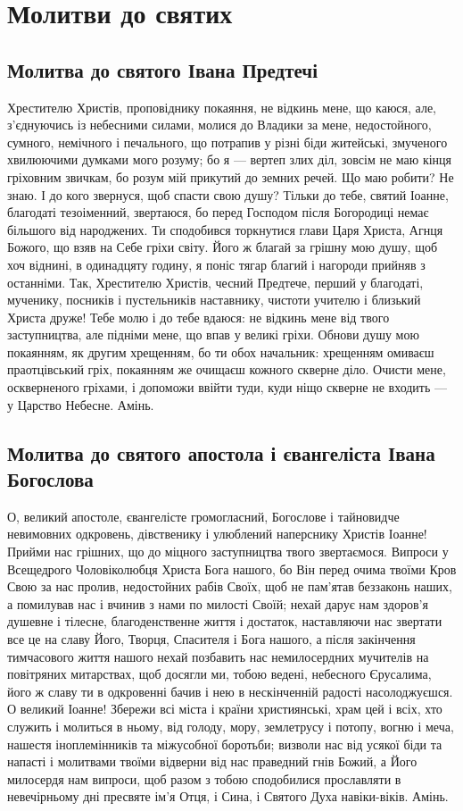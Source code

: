 \documentclass[chapters.tex]{subfiles}
\begin{document}
\chapter{Молитви до святих}
\section{Молитва до святого Івана Предтечі}
Хрестителю Христів, проповіднику покаяння, не відкинь мене, що каюся, але, з’єднуючись із небесними силами, молися до Владики за мене, недостойного, сумного, немічного і печального, що потрапив у різні біди житейські, змученого хвилюючими думками мого розуму; бо я — вертеп злих діл, зовсім не маю кінця гріховним звичкам, бо розум мій прикутий до земних речей. Що маю робити? Не знаю. І до кого звернуся, щоб спасти свою душу? Тільки до тебе, святий Іоанне, благодаті тезоіменний, звертаюся, бо перед Господом після Богородиці немає більшого від народжених. Ти сподобився торкнутися глави Царя Христа, Агнця Божого, що взяв на Себе гріхи світу. Його ж благай за грішну мою душу, щоб хоч віднині, в одинадцяту годину, я поніс тягар благий і нагороди прийняв з останніми. Так, Хрестителю Христів, чесний Предтече, перший у благодаті, мученику, посників і пустельників наставнику, чистоти учителю і близький Христа друже! Тебе молю і до тебе вдаюся: не відкинь мене від твого заступництва, але підніми мене, що впав у великі гріхи. Обнови душу мою покаянням, як другим хрещенням, бо ти обох начальник: хрещенням омиваєш праотцівський гріх, покаянням же очищаєш кожного скверне діло. Очисти мене, оскверненого гріхами, і допоможи ввійти туди, куди ніщо скверне не входить — у Царство Небесне. Амінь.

\section{Молитва до святого апостола і євангеліста Івана Богослова}
О, великий апостоле, євангелісте громогласний, Богослове і тайновидче невимовних одкровень, дівственику і улюблений наперснику Христів Іоанне! Прийми нас грішних, що до міцного заступництва твого звертаємося. Випроси у Всещедрого Чоловіколюбця Христа Бога нашого, бо Він перед очима твоїми Кров Свою за нас пролив, недостойних рабів Своїх, щоб не пам’ятав беззаконь наших, а помилував нас і вчинив з нами по милості Своїй; нехай дарує нам здоров’я душевне і тілесне, благоденственне життя і достаток, наставляючи нас звертати все це на славу Його, Творця, Спасителя і Бога нашого, а після закінчення тимчасового життя нашого нехай позбавить нас немилосердних мучителів на повітряних митарствах, щоб досягли ми, тобою ведені, небесного Єрусалима, його ж славу ти в одкровенні бачив і нею в нескінченній радості насолоджуєшся. О великий Іоанне! Збережи всі міста і країни християнські, храм цей і всіх, хто служить і молиться в ньому, від голоду, мору, землетрусу і потопу, вогню і меча, нашестя іноплемінників та міжусобної боротьби; визволи нас від усякої біди та напасті і молитвами твоїми відверни від нас праведний гнів Божий, а Його милосердя нам випроси, щоб разом з тобою сподобилися прославляти в невечірньому дні пресвяте ім’я Отця, і Сина, і Святого Духа навіки-віків. Амінь.
\end{document}
